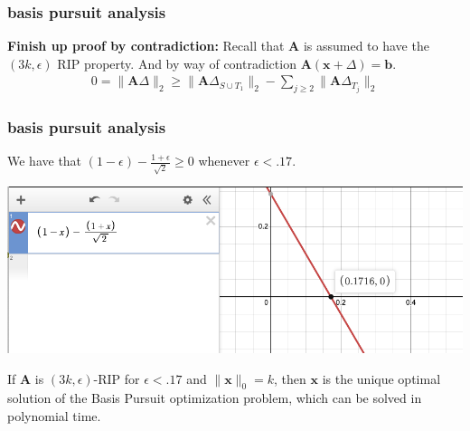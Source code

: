 \documentclass[compress]{beamer}
\newcommand{\bv}[1]{\mathbf{#1}}
\begin{document}
	\begin{frame}[t]
		\frametitle{basis pursuit analysis}
		\textbf{Finish up proof by contradiction:}
		Recall that $\bv{A}$ is assumed to have the $(3k,\epsilon)$ RIP property. And by way of contradiction $\bv{A}(\bv{x} + \Delta) = \bv{b}$.
		\begin{align*}
			0 = \|\bv{A}\Delta\|_2 \geq  \|\bv{A}\Delta_{S\cup T_1}\|_2 - \sum_{j\geq 2} \|\bv{A}\Delta_{T_j}\|_2
		\end{align*}
	\end{frame}

	\begin{frame}[t]
	\frametitle{basis pursuit analysis}
	We have that $(1-\epsilon) - \frac{1+\epsilon}{\sqrt{2}} \geq 0$ whenever $\epsilon < .17$.
		\begin{center}
			\includegraphics[width=.8\textwidth]{desmos.png}
		\end{center}
		\begin{theorem}
		If $\bv{A}$ is $(3k, \epsilon)$-RIP for $\epsilon < .17$ and $\|\bv{x}\|_0 = k$, then $\bv{x}$ is the unique optimal solution of the Basis Pursuit optimization problem, which can be solved in polynomial time.
	\end{theorem}
	\end{frame}
	
\end{document}
